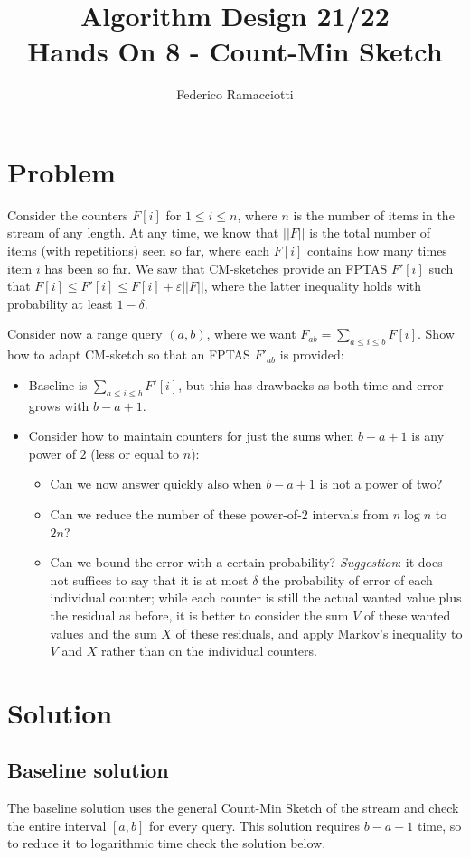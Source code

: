 \documentclass{article}
\title{\LARGE{\textbf{Algorithm Design 21/22}}\\ \vspace{1cm} Hands On 8 - Count-Min Sketch}
\author{Federico Ramacciotti}
\date{}
\begin{document}
\maketitle

\section{Problem}
Consider the counters $F[i]$ for $1 \leq i \leq n$, where $n$ is the number of items in the stream of any length. At any time, we know that $||F||$ is the total number of items (with repetitions) seen so far, where each $F[i]$ contains how many times item $i$ has been so far. We saw that CM-sketches provide an FPTAS $F'[i]$ such that $F[i] \leq F'[i] \leq F[i] + \varepsilon ||F||$, where the latter inequality holds with probability at least $1 - \delta$.

Consider now a range query $(a,b)$, where we want $F_{ab} =\sum_{a \leq i \leq b} F[i]$. Show how to adapt CM-sketch so that an FPTAS $F'_{ab}$ is provided:
\begin{itemize}
    \item Baseline is $\sum_{a \leq i \leq b} F'[i]$, but this has drawbacks as both time and error grows with $b-a+1$.
    \item Consider how to maintain counters for just the sums when $b-a+1$ is any power of $2$ (less or equal to $n$):
    \begin{itemize}
        \item Can we now answer quickly also when $b-a+1$ is not a power of two?
	    \item Can we reduce the number of these power-of-$2$ intervals from $n \log n$ to $2n$?
	    \item Can we bound the error with a certain probability? \textit{Suggestion}: it does not suffices to say that it is at most $\delta$ the probability of error of each individual counter; while each counter is still the actual wanted value plus the residual as before, it is better to consider the sum $V$ of these wanted values and the sum $X$ of these residuals, and apply Markov’s inequality to $V$ and $X$ rather than on the individual counters.
    \end{itemize}
\end{itemize}

\section{Solution}
\subsection{Baseline solution}
The baseline solution uses the general Count-Min Sketch of the stream and check the entire interval $[a,b]$ for every query. This solution requires $b-a+1$ time, so to reduce it to logarithmic time check the solution below.
\end{document}
